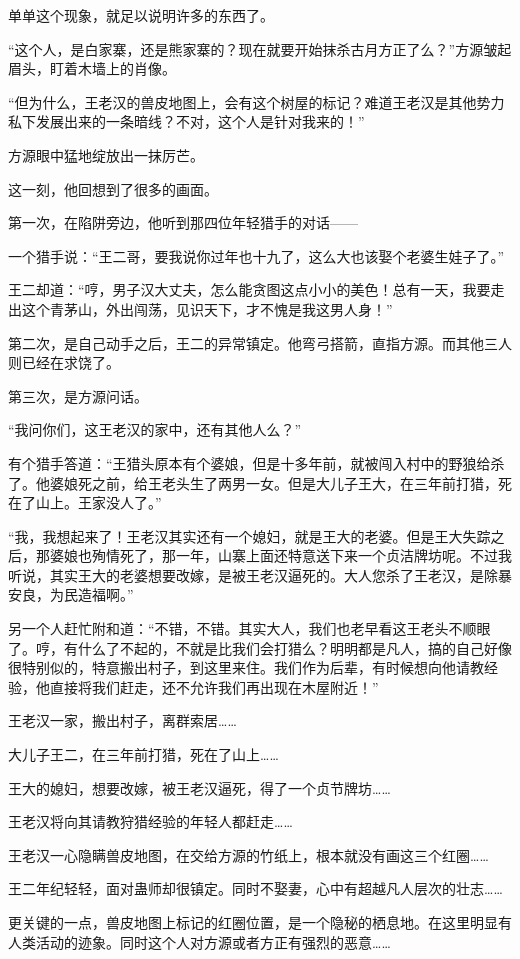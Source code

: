 \begin{this_body}
单单这个现象，就足以说明许多的东西了。

“这个人，是白家寨，还是熊家寨的？现在就要开始抹杀古月方正了么？”方源皱起眉头，盯着木墙上的肖像。

“但为什么，王老汉的兽皮地图上，会有这个树屋的标记？难道王老汉是其他势力私下发展出来的一条暗线？不对，这个人是针对我来的！”

方源眼中猛地绽放出一抹厉芒。

这一刻，他回想到了很多的画面。

第一次，在陷阱旁边，他听到那四位年轻猎手的对话——

一个猎手说：“王二哥，要我说你过年也十九了，这么大也该娶个老婆生娃子了。”

王二却道：“哼，男子汉大丈夫，怎么能贪图这点小小的美色！总有一天，我要走出这个青茅山，外出闯荡，见识天下，才不愧是我这男人身！”

第二次，是自己动手之后，王二的异常镇定。他弯弓搭箭，直指方源。而其他三人则已经在求饶了。

第三次，是方源问话。

“我问你们，这王老汉的家中，还有其他人么？”

有个猎手答道：“王猎头原本有个婆娘，但是十多年前，就被闯入村中的野狼给杀了。他婆娘死之前，给王老头生了两男一女。但是大儿子王大，在三年前打猎，死在了山上。王家没人了。”

“我，我想起来了！王老汉其实还有一个媳妇，就是王大的老婆。但是王大失踪之后，那婆娘也殉情死了，那一年，山寨上面还特意送下来一个贞洁牌坊呢。不过我听说，其实王大的老婆想要改嫁，是被王老汉逼死的。大人您杀了王老汉，是除暴安良，为民造福啊。”

另一个人赶忙附和道：“不错，不错。其实大人，我们也老早看这王老头不顺眼了。哼，有什么了不起的，不就是比我们会打猎么？明明都是凡人，搞的自己好像很特别似的，特意搬出村子，到这里来住。我们作为后辈，有时候想向他请教经验，他直接将我们赶走，还不允许我们再出现在木屋附近！”

王老汉一家，搬出村子，离群索居……

大儿子王二，在三年前打猎，死在了山上……

王大的媳妇，想要改嫁，被王老汉逼死，得了一个贞节牌坊……

王老汉将向其请教狩猎经验的年轻人都赶走……

王老汉一心隐瞒兽皮地图，在交给方源的竹纸上，根本就没有画这三个红圈……

王二年纪轻轻，面对蛊师却很镇定。同时不娶妻，心中有超越凡人层次的壮志……

更关键的一点，兽皮地图上标记的红圈位置，是一个隐秘的栖息地。在这里明显有人类活动的迹象。同时这个人对方源或者方正有强烈的恶意……


\end{this_body}
